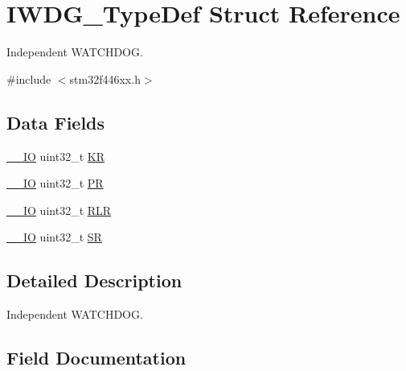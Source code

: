 \hypertarget{struct_i_w_d_g___type_def}{}\section{I\+W\+D\+G\+\_\+\+Type\+Def Struct Reference}
\label{struct_i_w_d_g___type_def}


Independent W\+A\+T\+C\+H\+D\+OG.  




{\ttfamily \#include $<$stm32f446xx.\+h$>$}

\subsection*{Data Fields}
\begin{DoxyCompactItemize}
\item 
\mbox{\hyperlink{core__sc300_8h_aec43007d9998a0a0e01faede4133d6be}{\+\_\+\+\_\+\+IO}} uint32\+\_\+t \mbox{\hyperlink{struct_i_w_d_g___type_def_a2f692354bde770f2a5e3e1b294ec064b}{KR}}
\item 
\mbox{\hyperlink{core__sc300_8h_aec43007d9998a0a0e01faede4133d6be}{\+\_\+\+\_\+\+IO}} uint32\+\_\+t \mbox{\hyperlink{struct_i_w_d_g___type_def_af8d25514079514d38c104402f46470af}{PR}}
\item 
\mbox{\hyperlink{core__sc300_8h_aec43007d9998a0a0e01faede4133d6be}{\+\_\+\+\_\+\+IO}} uint32\+\_\+t \mbox{\hyperlink{struct_i_w_d_g___type_def_a7015e1046dbd3ea8783b33dc11a69e52}{R\+LR}}
\item 
\mbox{\hyperlink{core__sc300_8h_aec43007d9998a0a0e01faede4133d6be}{\+\_\+\+\_\+\+IO}} uint32\+\_\+t \mbox{\hyperlink{struct_i_w_d_g___type_def_af6aca2bbd40c0fb6df7c3aebe224a360}{SR}}
\end{DoxyCompactItemize}


\subsection{Detailed Description}
Independent W\+A\+T\+C\+H\+D\+OG. 

\subsection{Field Documentation}
\mbox{\label{struct_i_w_d_g___type_def_a2f692354bde770f2a5e3e1b294ec064b}} 
